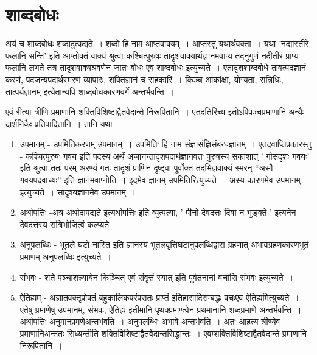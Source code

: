 {\section*{शाब्दबोधः}

अयं च शाब्दबोधः शब्दादुत्पद्यते~। शब्दो हि नाम आप्तवाक्यम्~। आप्तस्तु यथार्थवक्ता~। यथा ’नद्यास्तीरे फलानि सन्ति’ इति आप्तोक्तं वाक्यं श्रुत्वा कश्चित्पुरुषः तादृशवाक्यार्थज्ञानमवाप्य तदनुगुणं नदीतीरं प्राप्य फलानि लभते तत्र तादृशवाक्यश्रवणेन जातः बोधः एव शाब्दबोधः इत्युच्यते~। एतादृशशाब्दबोधे तावत्पदज्ञानं करणं, पदजन्यपदार्थस्मरणं व्यापारः, शक्तिज्ञानं च सहकारि~। किञ्च आकांक्षा, योग्यता, सन्निधिः, तात्पर्यज्ञानम् इत्येतान्यपि शाब्दबोधकारणवर्गे अन्तर्भवन्ति~। 

एवं रीत्या त्रीणि प्रमाणानि शक्तिविशिष्टाद्वैतवेदान्ते निरूपितानि~। एतदतिरिच्य इतोऽपिपञ्चप्रमाणानि अन्यैः दार्शनिकैः प्रतिपादितानि~। तानि यथा -
\begin{enumerate}
\item उपमानम् - उपमितिकरणम् उपमानम्~। उपमितिः हि नाम संज्ञासंज्ञिसंबन्धज्ञानम्~। एतदवाप्तिप्रकारस्तु - कश्चित्पुरुषः गवय इति पदस्य अर्थं अजानन्तादृशपदार्थ\-ज्ञानवतः पुरुषस्य सकाशात् ’  गोसदृशः गवयः’ इति श्रुत्वा ततः परम् अरण्यं गतः तादृशं प्राणिनं दृष्ट्वा पूर्वोक्तं तदभिज्ञवाक्यं स्मरन् “असौ गवयपदवाच्यः” इति ज्ञानमवाप्नोति~। इदमेव ज्ञानम् उपमितिरित्युच्यते~। अस्य कारणमेव उपमानम् इत्युच्यते~। सादृश्यज्ञानमेव उपमानम्~। 
\item अर्थापत्तिः -अत्र अर्थादापद्यते इत्यर्थापत्तिः इति व्युत्पत्या, ’ पीनो देवदत्तः दिवा न भुङ्क्ते ’ इत्यनेन देवदत्तस्य रात्रिभोजित्वं कल्प्यते~। 
\item अनुपलब्धिः - भूतले घटो नास्ति इति ज्ञानस्य भूतलवृत्तिघटानुपलब्धिद्वारा ग्रहणात् अभावग्रहणकारणभूतं प्रमाणम् अनुपलब्धिः इत्युच्यते~। 
\item संभवः - शते पञ्चाशन्न्यायेन किञ्चित् एवं संवृत्तं स्यात् इति पूर्वतनानां वचांसि संभवः इत्युच्यते~। 
\item ऐतिह्यम् - अज्ञातवक्तृप्रोक्तं बहुकालिकपरंपरातः प्राप्तं इतिहासादिसम्बद्धः वचः\break एव ऐतिह्यमित्युच्यते~। एतेषु प्रमाणेषु उपमानम्, संभवः, ऐतिह्यं इतीमानि पृथक्प्र\-माण्त्वेन प्रथमानानि शब्दप्रमाणे अन्तर्भवन्ति~। अर्थापत्तिः अनुमानप्रमणे\break अन्तर्भवति~। अनुपलब्धिः अभावे अन्तर्भवति~। अतः आहत्य त्रीण्येव प्रमाणानि\break अन्ततः सिध्यन्तीति शक्तिविशिष्टाद्वैतवेदान्तसिद्धान्तः~। 
एवम्शक्तिविशिष्टाद्वैत\-वेदान्ते प्रमाणानि निरूपितानि~। 
\end{enumerate}
\articleend
}
